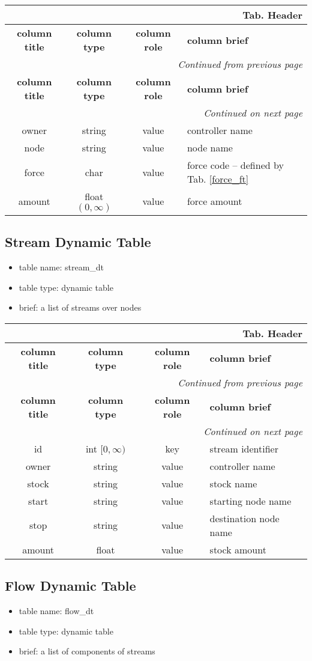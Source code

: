 \documentclass[a4paper,oneside,titlepage]{report}
\newcommand*{\LTHeaderIV}[5]{
  \multicolumn{4}{r}{\textbf{Tab. \thesubsection} \textbf{#1}}\\    
  \hline
  \textbf{#2} & \textbf{#3} & \textbf{#4} & \textbf{#5}\\
  \hline
  
  \endfirsthead
  \multicolumn{4}{r}{\textit{Continued from previous page}}\\    
  \hline
  \textbf{#2} & \textbf{#3} & \textbf{#4} & \textbf{#5}\\
  \hline
  \endhead
  \hline
  \multicolumn{4}{r}{\textit{Continued on next page}}\\
  \endfoot
  \hline
  \endlastfoot  
}
\begin{document}
\vspace{-0.5cm}
\begin{longtable}{ |c|c|c|l| } 
  \LTHeaderIV{Header}{column title}{column type}{column role}{column brief}                    
  owner & string & value & controller name\\
  node & string & value & node name\\
  force & char & value & force code -- defined by Tab. \ref{force_ft}\\
  amount & float $(0, \infty)$ & value & force amount\\
\end{longtable}        


\subsection{Stream Dynamic Table}
\begin{itemize}
  \setlength{\itemsep}{0pt}
  \setlength{\parskip}{0pt}
\item table name: stream\_dt  
\item table type: dynamic table   
\item brief: a list of streams over nodes
\end{itemize}

\vspace{-0.5cm}
\begin{longtable}{ |c|c|c|l| } 
  \LTHeaderIV{Header}{column title}{column type}{column role}{column brief}                    
  id & int $[0, \infty)$ & key & stream identifier\\
  owner & string & value & controller name\\
  stock & string & value & stock name\\
  start & string & value & starting node name\\
  stop & string & value & destination node name\\
  amount & float & value & stock amount \\
\end{longtable}        


\subsection{Flow Dynamic Table}
\begin{itemize}
  \setlength{\itemsep}{0pt}
  \setlength{\parskip}{0pt}
\item table name: flow\_dt  
\item table type: dynamic table   
\item brief: a list of components of streams
\end{itemize}
\end{document}
